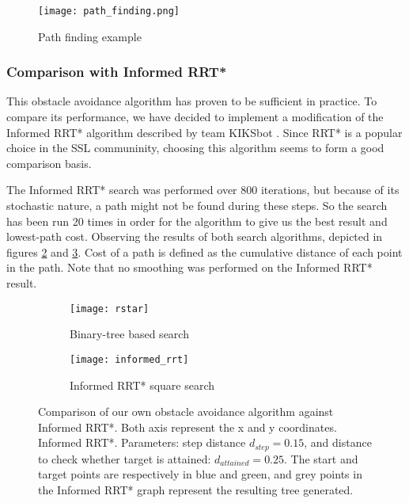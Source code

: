 \begin{figure}
    \centering
    \texttt{[image: path\_finding.png]}
    \caption{Path finding example}
    \label{fig:path_finding}
\end{figure}

\subsubsection{Comparison with Informed RRT*}
This obstacle avoidance algorithm has proven to be sufficient in practice. To compare its performance, we have decided to implement
a modification of the Informed RRT* algorithm described by team KIKSbot \cite{tdp_kiksbot_2023}. Since RRT* is a popular choice in the SSL communinity,
choosing this algorithm seems to form a good comparison basis.

The Informed RRT* search was performed over 800 iterations, but because of its stochastic nature, a path might not be found
during these steps. So the search has been run 20 times in order for the algorithm to give us the best result and lowest-path cost.
Observing the results of both search algorithms, depicted in figures \ref{fig:own-obs-avoid} and \ref{fig:informed-rrt-star}.
Cost of a path is defined as the cumulative distance of each point in the path. Note that no smoothing was performed on the Informed RRT* result.

\begin{figure}[h]
    \centering
    \begin{subfigure}[c][][c]{0.4\linewidth}
        \texttt{[image: rstar]}
        \caption{Binary-tree based search}
        \label{fig:own-obs-avoid}
    \end{subfigure}
    \hfill
    \begin{subfigure}[c][][c]{0.4\linewidth}
        \texttt{[image: informed\_rrt]}
        \caption{Informed RRT* square search}
        \label{fig:informed-rrt-star}
    \end{subfigure}
    \label{fig:avoidance}
    \caption{Comparison of our own obstacle avoidance algorithm against Informed RRT*. Both axis represent the x and y coordinates.
    Informed RRT*. Parameters: step distance $d_{step} = 0.15$, and distance to check whether target is attained: $d_{attained} = 0.25$.
    The start and target points are respectively in blue and green,
    and grey points in the Informed RRT* graph represent the resulting tree generated.}
\end{figure}
